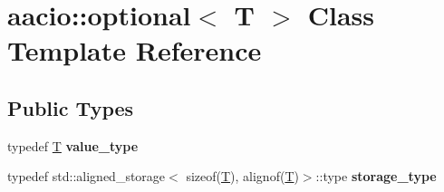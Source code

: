 \hypertarget{classaacio_1_1optional}{}\section{aacio\+:\+:optional$<$ T $>$ Class Template Reference}
\label{classaacio_1_1optional}
\subsection*{Public Types}
\begin{DoxyCompactItemize}
\item 
\mbox{\label{classaacio_1_1optional_a74014133325a59b9b2bda357c5d8210f}} 
typedef \mbox{\hyperlink{struct_t}{T}} {\bfseries value\+\_\+type}
\item 
\mbox{\label{classaacio_1_1optional_a15460c4528496af18658b5ee0b5fb6b2}} 
typedef std\+::aligned\+\_\+storage$<$ sizeof(\mbox{\hyperlink{struct_t}{T}}), alignof(\mbox{\hyperlink{struct_t}{T}})$>$\+::type {\bfseries storage\+\_\+type}
\end{DoxyCompactItemize}
